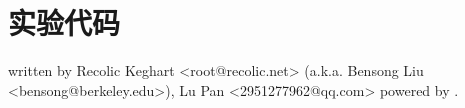 \documentclass{report}
\begin{document}


\appendix
{}
{\let\clearpage\relax \chapter*{实验代码}}

\vfill
{\tiny written by Recolic Keghart <root@recolic.net> (a.k.a. Bensong Liu <bensong@berkeley.edu>), Lu Pan <2951277962@qq.com> \hfill powered by \XeLaTeX .}
\end{document}
